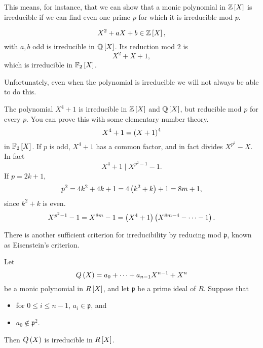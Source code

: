 This means, for instance, that we can show that a monic polynomial in $ \Z\sb{X} $ is irreducible if we can find even one prime $ p $ for which it is irreducible mod $ p $.

\begin{example2}
$$ X^2 + aX + b \in \Z\sb{X}, $$
with $ a, b $ odd is irreducible in $ \Q\sb{X} $. Its reduction mod $ 2 $ is
$$ X^2 + X + 1, $$
which is irreducible in $ \F_2\sb{X} $.
\end{example2}

Unfortunately, even when the polynomial is irreducible we will not always be able to do this.

\begin{example2}
The polynomial $ X^4 + 1 $ is irreducible in $ \Z\sb{X} $ and $ \Q\sb{X} $, but reducible mod $ p $ for every $ p $. You can prove this with some elementary number theory.
$$ X^4 + 1 = \rb{X + 1}^4 $$
in $ \F_2\sb{X} $. If $ p $ is odd, $ X^4 + 1 $ has a common factor, and in fact divides $ X^{p^2} - X $. In fact
$$ X^4 + 1 \mid X^{p^2 - 1} - 1. $$
If $ p = 2k + 1 $,
$$ p^2 = 4k^2 + 4k + 1 = 4\rb{k^2 + k} + 1 = 8m + 1, $$
since $ k^2 + k $ is even.
$$ X^{p^2 - 1} - 1 = X^{8m} - 1 = \rb{X^4 + 1}\rb{X^{8m - 4} - \dots - 1}. $$
\end{example2}

There is another sufficient criterion for irreducibility by reducing mod $ \mathfrak{p} $, known as Eisenstein's criterion.

\begin{proposition}
Let
$$ Q\rb{X} = a_0 + \dots + a_{n - 1}X^{n - 1} + X^n $$
be a monic polynomial in $ R\sb{X} $, and let $ \mathfrak{p} $ be a prime ideal of $ R $. Suppose that
\begin{itemize}
\item for $ 0 \le i \le n - 1 $, $ a_i \in \mathfrak{p} $, and
\item $ a_0 \notin \mathfrak{p}^2 $.
\end{itemize}
Then $ Q\rb{X} $ is irreducible in $ R\sb{X} $.
\end{proposition}

